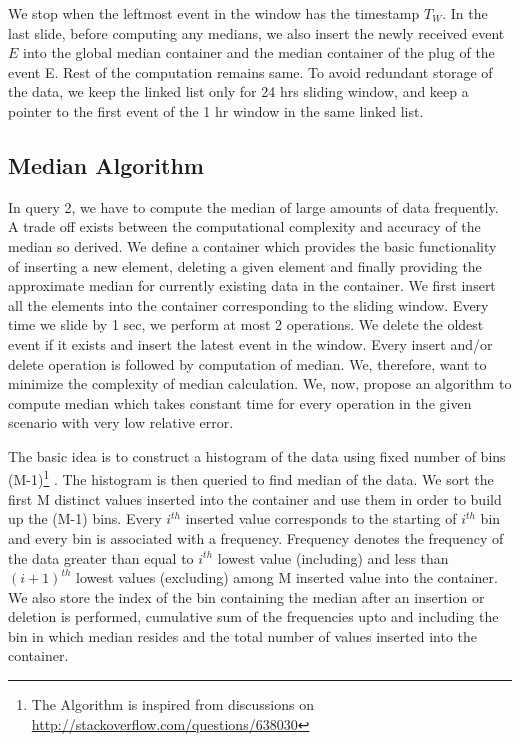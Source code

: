 We stop when the leftmost event in the window has the timestamp $T_W$. In the last slide, before computing any medians, we also insert the newly received event $E$ into the global median container and the median container of the plug of the event E. Rest of the computation remains same. To avoid redundant storage of the data, we keep the linked list only for 24 hrs sliding window, and keep a pointer to the first event of the 1 hr window in the same linked list.


\subsection{Median Algorithm}
In query 2, we have to compute the median of large amounts of data frequently. A trade off exists between the computational complexity and accuracy of the median so derived. We define a container which provides the basic functionality of inserting a new element, deleting a given element and finally providing the approximate median for currently existing data in the container. We first insert all the elements into the container corresponding to the sliding window. Every time we slide by 1 sec, we perform at most 2 operations. We delete the oldest event if it exists and insert the latest event in the window. Every insert and/or delete operation is followed by computation of median. We, therefore, want to minimize the complexity of median calculation. We, now, propose an algorithm to compute median which takes constant time for every operation in the given scenario with very low relative error.

The basic idea is to construct a histogram of the data using fixed number of bins (M-1)\footnote{The Algorithm is inspired from discussions on \url{http://stackoverflow.com/questions/638030}} . The histogram is then queried to find median of the data. We sort the first M distinct values inserted into the container and use them in order to build up the (M-1) bins. Every $i^{th}$ inserted value corresponds to the starting of $i^{th}$ bin and every bin is associated with a frequency. Frequency denotes the frequency of the data greater than equal to $i^{th}$ lowest value (including) and less than $(i+1)^{th}$ lowest values (excluding) among M inserted value into the container. We also store the index of the bin containing the median after an insertion or deletion is performed, cumulative sum of the frequencies upto and including the bin in which median resides and the total number of values inserted into the container.

